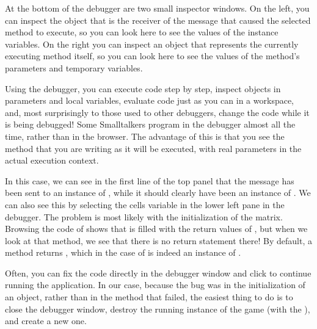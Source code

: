 \documentclass[a4paper,10pt,twoside]{book}
\begin{document}
At the bottom of the debugger are two small inspector windows.  On the left, you can inspect the object that is the receiver of the message that caused the selected method to execute, so you can look here to see the values of the instance variables.
On the right you can inspect an object that represents the currently executing method itself, so you can look here to see the values of the method's parameters and temporary variables.

Using the debugger, you can execute code step by step, inspect objects in parameters and local variables, evaluate code just as you can in a workspace, and, most surprisingly to those used to other debuggers, change the code while it is being debugged! Some Smalltalkers program in the debugger almost all the time, rather than in the browser.  The advantage of this is that you see the method that you are writing as it will be executed, with real parameters in the actual execution context.

In this case, we can see in the first line of the top panel that the  message has been sent to an instance of , while it should clearly have been an instance of .
We can also see this by selecting the cells variable in the lower left pane in the debugger.
The problem is most likely with the initialization of the  matrix.
Browsing the code of  shows that  is filled with the return values of , but when we look at that method, we see that there is no return statement there!
By default, a method returns , which in the case of  is indeed an instance of .

\dothis{Close the debugger window.
Add the expression ``\ct{^ cell}'' to the end of the method \ct{SBEGame>>>newCellAt:at:} so that it returns \ct{cell}.
(See \mthref{newCellAt:at:nobug}.)}



Often, you can fix the code directly in the debugger window and click  to continue running the application.
In our case, because the bug was in the initialization of an object, rather than in the method that failed, the easiest thing to do is to close the debugger window, destroy the running instance of the game (with the ), and create a new one.
\end{document}
